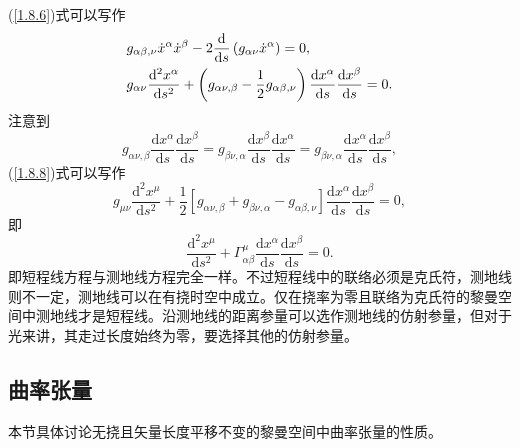 \documentclass[11pt, a4paper, oneside, onecolumn]{ctexart}
\numberwithin{equation}{subsection}
\begin{document}
(\ref{1.8.6})式可以写作
\begin{align}
&g_{\alpha\beta,\nu}\dot{x}^{\alpha}\dot{x}^{\beta}-2\frac{\mathrm{d}}{\mathrm{d}s}\left(g_{\alpha\nu}\dot{x}^{\alpha}\right)=0,\notag\\
&g_{\alpha\nu}\frac{\mathrm{d}^{2}x^{\alpha}}{\mathrm{d}s^{2}}+\left(g_{\alpha\nu,\beta}-\frac12g_{\alpha\beta,\nu}\right)\frac{\mathrm{d}x^{\alpha}}{\mathrm{d}s}\frac{\mathrm{d}x^{\beta}}{\mathrm{d}s}=0.\label{1.8.8}
\end{align}
注意到
\begin{equation}
g_{\alpha\nu,\beta}\frac{\mathrm{d}x^{\alpha}}{\mathrm{d}s}\frac{\mathrm{d}x^{\beta}}{\mathrm{d}s}=g_{\beta\nu,\alpha}\frac{\mathrm{d}x^{\beta}}{\mathrm{d}s}\frac{\mathrm{d}x^{\alpha}}{\mathrm{d}s}=g_{\beta\nu,\alpha}\frac{\mathrm{d}x^{\alpha}}{\mathrm{d}s}\frac{\mathrm{d}x^{\beta}}{\mathrm{d}s},
\end{equation}
(\ref{1.8.8})式可以写作
\begin{equation}
g_{\mu\nu}\frac{\mathrm{d}^{2}x^{\mu}}{\mathrm{d}s^{2}}+\frac12\left[g_{\alpha\nu,\beta}+g_{\beta\nu,\alpha}-g_{\alpha\beta,\nu}\right]\frac{\mathrm{d}x^{\alpha}}{\mathrm{d}s}\frac{\mathrm{d}x^{\beta}}{\mathrm{d}s}=0,
\end{equation}
即
\begin{equation}
\frac{\mathrm{d}^{2}x^{\mu}}{\mathrm{d}s^{2}}+\Gamma_{\alpha\beta}^{\mu}\frac{\mathrm{d}x^{\alpha}}{\mathrm{d}s}\frac{\mathrm{d}x^{\beta}}{\mathrm{d}s}=0.
\end{equation}
即短程线方程与测地线方程完全一样。不过短程线中的联络必须是克氏符，测地线则不一定，测地线可以在有挠时空中成立。仅在挠率为零且联络为克氏符的黎曼空间中测地线才是短程线。沿测地线的距离参量可以选作测地线的仿射参量，但对于光来讲，其走过长度始终为零，要选择其他的仿射参量。

\subsection{曲率张量}
本节具体讨论无挠且矢量长度平移不变的黎曼空间中曲率张量的性质。
\end{document}
